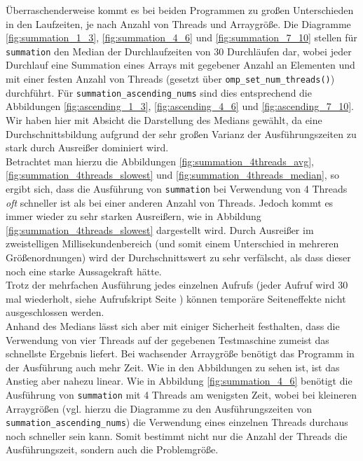 \documentclass[a4paper,
12pt,
BCOR12mm,
]{scrartcl}
\begin{document}
Überraschenderweise kommt es bei beiden Programmen zu großen Unterschieden in den
Laufzeiten, je nach Anzahl von Threads und Arraygröße. Die Diagramme \ref{fig:summation_1_3},
\ref{fig:summation_4_6} und \ref{fig:summation_7_10} stellen für \verb|summation| den
Median der Durchlaufzeiten von 30 Durchläufen dar, wobei jeder Durchlauf eine Summation eines
Arrays mit gegebener Anzahl an Elementen und mit einer festen Anzahl von Threads (gesetzt
über \verb|omp_set_num_threads()|) durchführt. Für \verb|summation_ascending_nums| sind dies
entsprechend die Abbildungen \ref{fig:ascending_1_3}, \ref{fig:ascending_4_6} und
\ref{fig:ascending_7_10}. Wir haben hier mit Absicht die Darstellung des Medians gewählt,
da eine Durchschnittsbildung aufgrund der sehr großen Varianz der Ausführungszeiten zu
stark durch Ausreißer dominiert wird. \\
Betrachtet man hierzu die Abbildungen \ref{fig:summation_4threads_avg},
\ref{fig:summation_4threads_slowest} und \ref{fig:summation_4threads_median}, so ergibt
sich, dass die Ausführung von \verb|summation| bei Verwendung von 4 Threads
\emph{oft} schneller ist als bei einer anderen Anzahl von Threads. Jedoch kommt es immer wieder zu sehr starken
Ausreißern, wie in Abbildung \ref{fig:summation_4threads_slowest} dargestellt wird. Durch
Ausreißer im zweistelligen Millisekundenbereich (und somit einem Unterschied in mehreren
Größenordnungen) wird der Durchschnittswert zu sehr verfälscht, als dass dieser noch eine
starke Aussagekraft hätte.\\
Trotz der mehrfachen Ausführung jedes einzelnen Aufrufs (jeder Aufruf wird 30 mal
wiederholt, siehe Aufrufskript Seite \pageref{src:call}) können temporäre Seiteneffekte
nicht ausgeschlossen werden. \\
Anhand des Medians lässt sich aber mit einiger Sicherheit festhalten, dass die
Verwendung von vier Threads auf der gegebenen Testmaschine zumeist das schnellste Ergebnis
liefert. Bei wachsender Arraygröße benötigt das Programm in der Ausführung auch mehr Zeit.
Wie in den Abbildungen zu sehen ist, ist das Anstieg aber nahezu linear. Wie in Abbildung
\ref{fig:summation_4_6} benötigt die Ausführung von \verb|summation| mit 4 Threads am
wenigsten Zeit, wobei bei kleineren Arraygrößen (vgl. hierzu die Diagramme zu den
Ausführungszeiten von \verb|summation_ascending_nums|) die Verwendung eines einzelnen
Threads durchaus noch schneller sein kann. Somit bestimmt nicht nur die Anzahl der Threads
die Ausführungszeit, sondern auch die Problemgröße.
\end{document}
